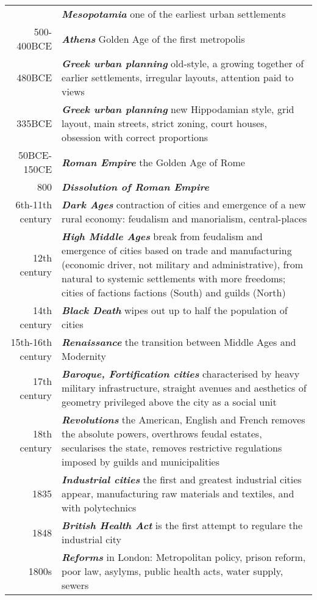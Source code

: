 \documentclass{article}
\newcommand{\foo}{\hspace{-2.3pt}$\bullet$ \hspace{5pt} }
\newcommand{\bisection}[1]{\textbf{\textit{#1}}}
\begin{document}
\begin{tabular}{r |@{\foo} p{}}
 & \bisection{Mesopotamia} one of the earliest urban settlements \\
500-400BCE & \bisection{Athens} Golden Age of the first metropolis \\
480BCE  & \bisection{Greek urban planning} old-style, a growing together of earlier settlements, irregular layouts, attention paid to views \\
335BCE  & \bisection{Greek urban planning} new Hippodamian style, grid layout, main streets, strict zoning, court houses, obsession with correct proportions \\
50BCE-150CE & \bisection{Roman Empire} the Golden Age of Rome \\
800 & \bisection{Dissolution of Roman Empire} \\
6th-11th century & \bisection{Dark Ages} contraction of cities and emergence of a new rural economy: feudalism and manorialism, central-places \\
12th century & \bisection{High Middle Ages} break from feudalism and emergence of cities based on trade and manufacturing (economic driver, not military and administrative), from natural to systemic settlements with more freedoms; cities of factions factions (South) and guilds (North) \\
14th century & \bisection{Black Death} wipes out up to half the population of cities \\
15th-16th century & \bisection{Renaissance} the transition between Middle Ages and Modernity \\
17th century & \bisection{Baroque, Fortification cities} characterised by heavy military infrastructure, straight avenues and aesthetics of geometry privileged above the city as a social unit \\
18th century & \bisection{Revolutions} the American, English and French removes the absolute powers, overthrows feudal estates, secularises the state, removes restrictive regulations imposed by guilds and municipalities \\
1835 & \bisection{Industrial cities} the first and greatest industrial cities appear, manufacturing raw materials and textiles, and with polytechnics \\
1848 & \bisection{British Health Act} is the first attempt to regulare the industrial city \\
1800s & \bisection{Reforms} in London: Metropolitan policy, prison reform, poor law, asylyms, public health acts, water supply, sewers  \\
\end{tabular}
\end{document}
